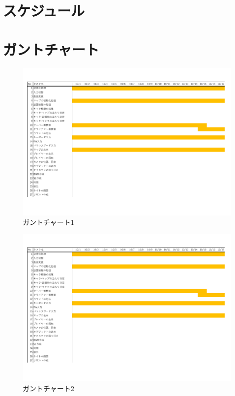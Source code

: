 \documentclass{jarticle}
\begin{document}
\section{スケジュール}

\section{ガントチャート}
\begin{figure}[h]
    \centering
    \label{table:gunt1}
    \caption{ガントチャート1}
    \includegraphics[scale=0.5, page=1]{gunt.pdf}
\end{figure}
\begin{figure}[h]
    \centering
    \label{table:gunt1}
    \caption{ガントチャート2}
    \includegraphics[scale=0.5, page=2]{gunt.pdf}
\end{figure}
\end{document}
